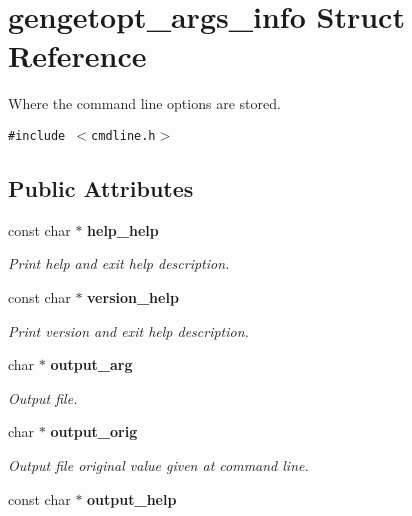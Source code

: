 \section{gengetopt\_\-args\_\-info Struct Reference}
\label{structgengetopt__args__info}
Where the command line options are stored.  


{\tt \#include $<$cmdline.h$>$}

\subsection*{Public Attributes}
\begin{CompactItemize}
\item 
const char $\ast$ \bf{help\_\-help}\label{structgengetopt__args__info_a034148a526905d1acf5fd795ac5b811}

\begin{CompactList}\small\item\em Print help and exit help description. \item\end{CompactList}\item 
const char $\ast$ \bf{version\_\-help}\label{structgengetopt__args__info_7839919c18379e3c7ef2513a169d60fb}

\begin{CompactList}\small\item\em Print version and exit help description. \item\end{CompactList}\item 
char $\ast$ \bf{output\_\-arg}\label{structgengetopt__args__info_9243f0750cf00caed1458d597e72c515}

\begin{CompactList}\small\item\em Output file. \item\end{CompactList}\item 
char $\ast$ \bf{output\_\-orig}\label{structgengetopt__args__info_40c14cbaae1f1fba54eba9c41ca927cd}

\begin{CompactList}\small\item\em Output file original value given at command line. \item\end{CompactList}\item 
const char $\ast$ \bf{output\_\-help}\label{structgengetopt__args__info_3eac1a7ee2330007a5e34252d8aac219}


\end{CompactItemize}
